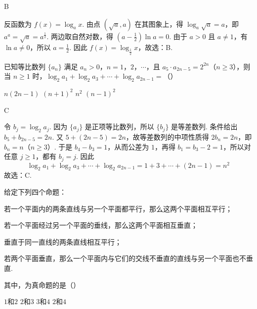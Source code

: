 \begin{answer}
B
\end{answer}

\begin{solution}
反函数为 \(f(x)=\log_a x\). 由点 \((\sqrt a,a)\) 在其图象上，得 \(\log_a\sqrt a=a\)，即 \(a^a=\sqrt a=a^{\frac{1}{2}}\). 两边取自然对数，得 \(\left(a-\frac12\right)\ln a=0\). 由于 \(a>0\) 且 \(a\neq1\)，有 \(\ln a\neq0\)，所以 \(a=\frac12\). 因此 \(f(x)=\log_{\frac12}x\)，故选：B.
\end{solution}

\begin{problem}
已知等比数列 \(\{a_n\}\) 满足 \(a_n > 0\)，\(n = 1\)，\(2\)，\(\cdots\)，且 \(a_5 \cdot a_{2n-5} = 2^{2n}\)（\(n \geqslant 3\)），则当 \(n \geqslant 1\) 时，\(\log_2 a_1 + \log_2 a_3 + \cdots + \log_2 a_{2n-1} =\)（\quad）

\choices
    {\(n(2n - 1)\)}
    {\((n + 1)^{2}\)}
    {\(n^{2}\)}
    {\((n - 1)^{2}\)}
\end{problem}

\begin{answer}
C
\end{answer}

\begin{solution}
令 \(b_j=\log_2a_j\). 因为 \(\{a_j\}\) 是正项等比数列，所以 \(\{b_j\}\) 是等差数列. 条件给出 \(b_5+b_{2n-5}=2n\). 又 \(5+(2n-5)=2n\)，故等差数列的中项性质得 \(2b_n=2n\)，即 \(b_n=n\)（\(n\geqslant3\)）. 于是 \(b_4-b_3=1\)，从而公差为 \(1\)，再得 \(b_1=b_3-2=1\)，所以对任意 \(j\geqslant1\)，都有 \(b_j=j\). 因此
\[
\log_2a_1+\log_2a_3+\cdots+\log_2a_{2n-1}=1+3+\cdots+(2n-1)=n^2
\]
故选：C.
\end{solution}

\begin{problem}
给定下列四个命题：
\begin{circlelist}
\item 若一个平面内的两条直线与另一个平面都平行，那么这两个平面相互平行；
\item 若一个平面经过另一个平面的垂线，那么这两个平面相互垂直；
\item 垂直于同一直线的两条直线相互平行；
\item 若两个平面垂直，那么一个平面内与它们的交线不垂直的直线与另一个平面也不垂直.
\end{circlelist}
其中，为真命题的是（\quad）

\choices
    {\(1\)和\(2\)}
    {\(2\)和\(3\)}
    {\(3\)和\(4\)}
    {\(2\)和\(4\)}
\end{problem}

